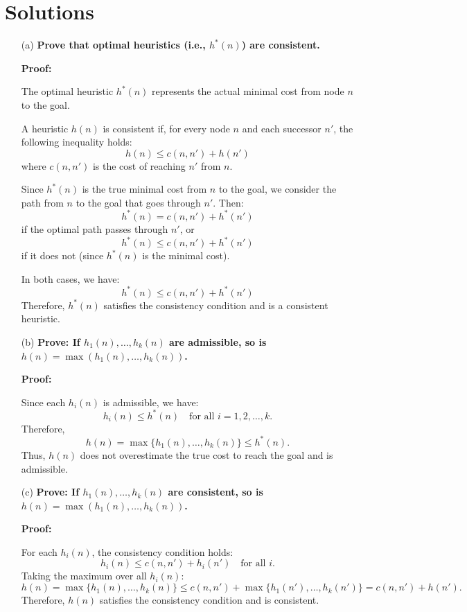 \documentclass{article}
\begin{document}
\section*{Solutions}

\begin{enumerate}
    \item[(a)] \textbf{Prove that optimal heuristics (i.e., $h^*(n)$) are consistent.}
    
    \textbf{Proof:}
    
    The optimal heuristic $h^*(n)$ represents the actual minimal cost from node $n$ to the goal.

    A heuristic $h(n)$ is consistent if, for every node $n$ and each successor $n'$, the following inequality holds:
    \[
    h(n) \leq c(n, n') + h(n')
    \]
    where $c(n, n')$ is the cost of reaching $n'$ from $n$.

    Since $h^*(n)$ is the true minimal cost from $n$ to the goal, we consider the path from $n$ to the goal that goes through $n'$. Then:
    \[
    h^*(n) = c(n, n') + h^*(n')
    \]
    if the optimal path passes through $n'$, or
    \[
    h^*(n) \leq c(n, n') + h^*(n')
    \]
    if it does not (since $h^*(n)$ is the minimal cost).

    In both cases, we have:
    \[
    h^*(n) \leq c(n, n') + h^*(n')
    \]
    Therefore, $h^*(n)$ satisfies the consistency condition and is a consistent heuristic.

    \item[(b)] \textbf{Prove: If $h_1(n), \ldots, h_k(n)$ are admissible, so is $h(n) = \max(h_1(n), \ldots, h_k(n))$.}
    
    \textbf{Proof:}
    
    Since each $h_i(n)$ is admissible, we have:
    \[
    h_i(n) \leq h^*(n) \quad \text{for all } i = 1, 2, \ldots, k.
    \]
    Therefore,
    \[
    h(n) = \max\{h_1(n), \ldots, h_k(n)\} \leq h^*(n).
    \]
    Thus, $h(n)$ does not overestimate the true cost to reach the goal and is admissible.

    \item[(c)] \textbf{Prove: If $h_1(n), \ldots, h_k(n)$ are consistent, so is $h(n) = \max(h_1(n), \ldots, h_k(n))$.}
    
    \textbf{Proof:}
    
    For each $h_i(n)$, the consistency condition holds:
    \[
    h_i(n) \leq c(n, n') + h_i(n') \quad \text{for all } i.
    \]
    Taking the maximum over all $h_i(n)$:
    \[
    h(n) = \max\{h_1(n), \ldots, h_k(n)\} \leq c(n, n') + \max\{h_1(n'), \ldots, h_k(n')\} = c(n, n') + h(n').
    \]
    Therefore, $h(n)$ satisfies the consistency condition and is consistent.


\end{enumerate}
\end{document}
